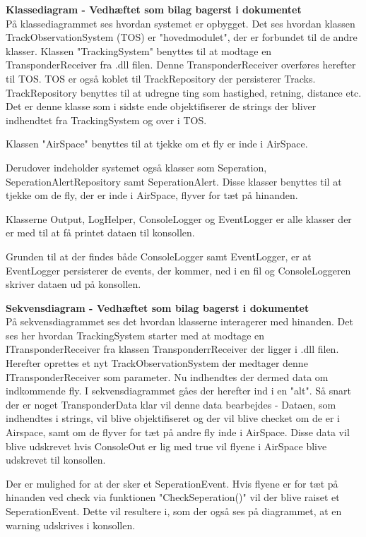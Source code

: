 \textbf{Klassediagram - Vedhæftet som bilag bagerst i dokumentet} \\
På klassediagrammet ses hvordan systemet er opbygget. \tabularnewline
Det ses hvordan klassen TrackObservationSystem (TOS) er "hovedmodulet", der er forbundet til de andre klasser.
Klassen "TrackingSystem" benyttes til at modtage en TransponderReceiver fra .dll filen. Denne TransponderReceiver overføres herefter til TOS.
TOS er også koblet til TrackRepository der persisterer Tracks. TrackRepository benyttes til at udregne ting som hastighed, retning, distance etc. Det er denne klasse som i sidste ende objektifiserer de strings der bliver indhendtet fra TrackingSystem og over i TOS.

Klassen "AirSpace" benyttes til at tjekke om et fly er inde i AirSpace.

Derudover indeholder systemet også klasser som Seperation, SeperationAlertRepository samt SeperationAlert. Disse klasser benyttes til at tjekke om de fly, der er inde i AirSpace, flyver for tæt på hinanden. 

Klasserne Output, LogHelper, ConsoleLogger og EventLogger er alle klasser der er med til at få printet dataen til konsollen. 

Grunden til at der findes både ConsoleLogger samt EventLogger, er at EventLogger persisterer de events, der kommer, ned i en fil og ConsoleLoggeren skriver dataen ud på konsollen. \newline

\textbf{Sekvensdiagram - Vedhæftet som bilag bagerst i dokumentet} \\
På sekvensdiagrammet ses det hvordan klasserne interagerer med hinanden. \tabularnewline
Det ses her hvordan TrackingSystem starter med at modtage en ITransponderReceiver fra klassen TransponderrReceiver der ligger i .dll filen. \tabularnewline
Herefter oprettes et nyt TrackObservationSystem der medtager denne ITransponderReceiver som parameter.\tabularnewline
Nu indhendtes der dermed data om indkommende fly. I sekvensdiagrammet gåes der herefter ind i en "alt". \tabularnewline
Så snart der er noget TransponderData klar vil denne data bearbejdes - Dataen, som indhendtes i strings, vil blive objektifiseret og der vil blive checket om de er i Airspace, samt om de flyver for tæt på andre fly inde i AirSpace.
Disse data vil blive udskrevet hvis ConsoleOut er lig med true vil flyene i AirSpace blive udskrevet til konsollen.

Der er mulighed for at der sker et SeperationEvent. \tabularnewline
Hvis flyene er for tæt på hinanden ved check via funktionen "CheckSeperation()" vil der blive raiset et SeperationEvent. 
Dette vil resultere i, som der også ses på diagrammet, at en warning udskrives i konsollen.


